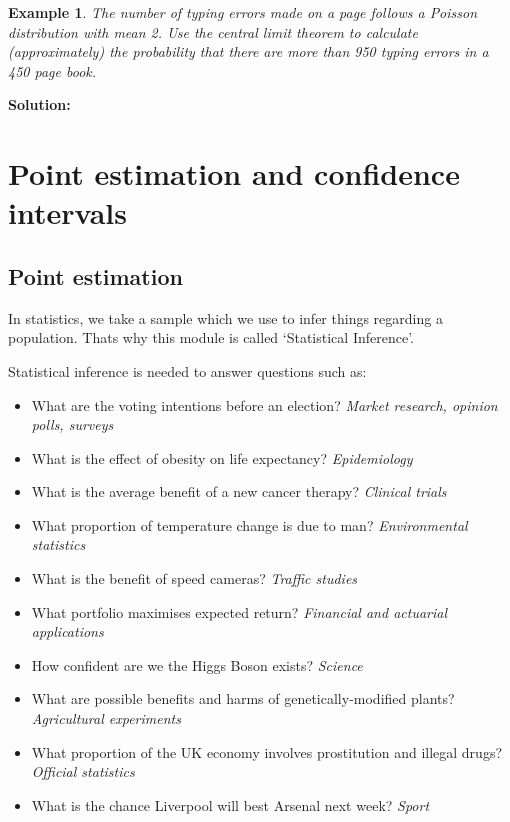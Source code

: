 \documentclass[12pt]{article}
\newtheorem{example}[theorem]{Example}
\begin{document}
\begin{example}
The number of typing errors made on a page follows a Poisson distribution with mean 2. Use the central limit theorem to calculate (approximately) the probability that there are more than 950 typing errors in a 450 page book.
\end{example}
\begin{mdframed}
{\bf Solution:}
\textcolor[rgb]{1.00,1.00,1.00}{\lipsum[1-2]}
\end{mdframed}

\newpage
\section{Point estimation and confidence intervals}
\subsection{Point estimation}
In statistics, we take a sample which we use to infer things regarding a population. Thats why this module is called `Statistical Inference'.

Statistical inference is needed to answer questions such as:
\begin{itemize}
\item What are the voting intentions before an election? \emph{Market research, opinion
polls, surveys}
\item What is the effect of obesity on life expectancy? \emph{Epidemiology}
\item What is the average benefit of a new cancer therapy? \emph{Clinical trials}
\item What proportion of temperature change is due to man? \emph{Environmental
statistics}
\item What is the benefit of speed cameras? \emph{Traffic studies}
\item What portfolio maximises expected return? \emph{Financial and actuarial
applications}
\item How confident are we the Higgs Boson exists? \emph{Science}
\item What are possible benefits and harms of genetically-modified plants?
\emph{Agricultural experiments}
\item What proportion of the UK economy involves prostitution and illegal drugs?
\emph{Official statistics}
\item What is the chance Liverpool will best Arsenal next week? \emph{Sport}
\end{itemize}
\end{document}
